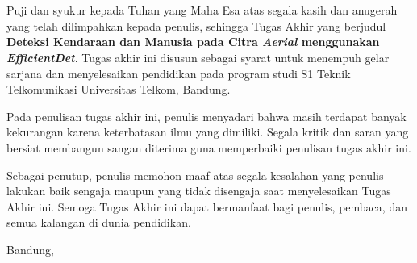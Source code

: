 \chapter*{\kataPengantar}
Puji dan syukur kepada Tuhan yang Maha Esa atas segala kasih dan anugerah yang telah dilimpahkan kepada penulis, sehingga Tugas Akhir yang berjudul \textbf{Deteksi Kendaraan dan Manusia pada Citra \textit{Aerial} menggunakan \textit{EfficientDet}}.
Tugas akhir ini disusun sebagai syarat untuk menempuh gelar sarjana dan menyelesaikan pendidikan pada program studi S1 Teknik Telkomunikasi Universitas Telkom, Bandung.

Pada penulisan tugas akhir ini, penulis menyadari bahwa masih terdapat banyak kekurangan karena keterbatasan ilmu yang dimiliki. Segala kritik dan saran yang bersiat membangun sangan diterima guna memperbaiki penulisan tugas akhir ini.

Sebagai penutup, penulis memohon maaf atas segala kesalahan yang penulis lakukan baik sengaja maupun yang tidak disengaja saat menyelesaikan Tugas Akhir ini. Semoga Tugas Akhir ini dapat bermanfaat bagi penulis, pembaca, dan semua kalangan di dunia pendidikan.
 
\vspace*{0.1cm}
\begin{flushright}
Bandung, \tanggalPengesahan\\[0.1cm]
\vspace*{1cm}
\penulis

\end{flushright}